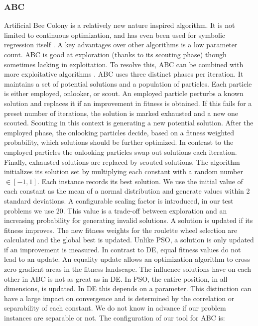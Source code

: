 \subsubsection{ABC}
Artificial Bee Colony \citep{ABC} is a relatively new nature inspired algorithm. It is not limited to continuous optimization, and has even been used for symbolic regression itself \cite{ABCSR}. A key advantages over other algorithms is a low parameter count. ABC is good at exploration (thanks to its scouting phase) though sometimes lacking in exploitation. To resolve this, ABC can be combined with more exploitative algorithms \citep{ABCPSO}.
ABC uses three distinct phases per iteration. It maintains a set of potential solutions and a population of particles. Each particle is either employed, onlooker, or scout. An employed particle perturbs a known solution and replaces it if an improvement in fitness is obtained. If this fails for a preset number of iterations, the solution is marked exhausted and a new one scouted. Scouting in this context is generating a new potential solution. After the employed phase, the onlooking particles decide, based on a fitness weighted probability, which solutions should be further optimized. In contrast to the employed particles the onlooking particles swap out solutions each iteration. Finally, exhausted solutions are replaced by scouted solutions.
The algorithm initializes its solution set by multiplying each constant with a random number $\in [-1,1]$. Each instance records its best solution. We use the initial value of each constant as the mean of a normal distribution and generate values within 2 standard deviations. A configurable scaling factor is introduced, in our test problems we use 20. This value is a trade-off between exploration and an increasing probability for generating invalid solutions. A solution is updated if its fitness improves. The new fitness weights for the roulette wheel selection are calculated and the global best is updated. Unlike PSO, a solution is only updated if an improvement is measured. In contrast to DE, equal fitness values do not lead to an update. An equality update allows an optimization algorithm to cross zero gradient areas in the fitness landscape. The influence solutions have on each other in ABC is not as great as in DE. In PSO, the entire position, in all dimensions, is updated. In DE this depends on a parameter. This distinction can have a large impact on convergence and is determined by the correlation or separability of each constant.
We do not know in advance if our problem instances are separable or not. The configuration of our tool for ABC is: 
